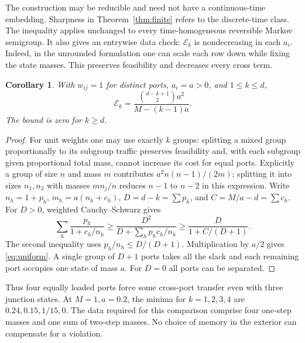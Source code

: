 \documentclass[11pt]{article}
\newtheorem{corollary}[theorem]{Corollary}
\newcommand{\E}{\mathcal E}
\begin{document}
The construction may be reducible and need not have a continuous-time embedding. Sharpness in Theorem~\ref{thm:finite} refers to the discrete-time class. The inequality applies unchanged to every time-homogeneous reversible Markov semigroup. It also gives an entrywise data check: \(\E_k\) is nondecreasing in each \(a_i\). Indeed, in the unrounded formulation one can scale each row down while fixing the state masses. This preserves feasibility and decreases every cross term.

\begin{corollary}\label{cor:equal}
With \(w_{ij}=1\) for distinct ports, \(a_i=a>0\), and \(1\le k\le d\),
\begin{equation}
 \E_k=\frac{\binom{d-k+1}{2}a^2}{M-(k-1)a}.               \label{eq:uniform}
\end{equation}
The bound is zero for \(k\ge d\).
\end{corollary}
\begin{proof}
For unit weights one may use exactly \(k\) groups: splitting a mixed group proportionally to its subgroup traffic preserves feasibility and, with each subgroup given proportional total mass, cannot increase its cost for equal ports. Explicitly a group of size \(n\) and mass \(m\) contributes \(a^2n(n-1)/(2m)\); splitting it into sizes \(n_1,n_2\) with masses \(mn_j/n\) reduces \(n-1\) to \(n-2\) in this expression. Write \(n_h=1+p_h\), \(m_h=a(n_h+c_h)\), \(D=d-k=\sum p_h\), and \(C=M/a-d=\sum c_h\). For \(D>0\), weighted Cauchy--Schwarz gives
\[
 \sum_h \frac{p_h}{1+c_h/n_h}
 \ge\frac{D^2}{D+\sum_h p_h c_h/n_h}
 \ge\frac{D}{1+C/(D+1)} .
\]
The second inequality uses \(p_h/n_h\le D/(D+1)\). Multiplication by \(a/2\) gives \eqref{eq:uniform}. A single group of \(D+1\) ports takes all the slack and each remaining port occupies one state of mass \(a\). For \(D=0\) all ports can be separated.
\end{proof}

Thus four equally loaded ports force some cross-port transfer even with three junction states. At \(M=1,a=0.2\), the minima for \(k=1,2,3,4\) are \(0.24,0.15,1/15,0\). The data required for this comparison comprise four one-step masses and one sum of two-step masses. No choice of memory in the exterior can compensate for a violation.


\end{document}
